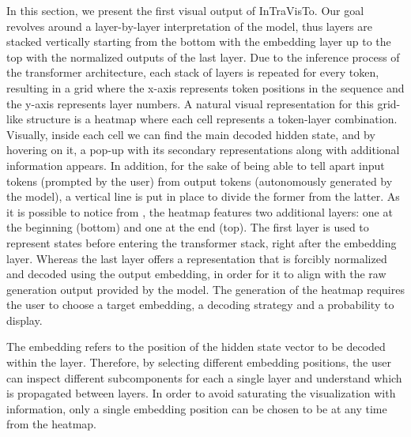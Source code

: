 In this section, we present the first visual output of InTraVisTo.
Our goal revolves around a layer-by-layer interpretation of the model, thus layers are stacked vertically starting from the bottom with the embedding layer up to the top with the normalized outputs of the last layer.
Due to the inference process of the transformer architecture, each stack of layers is repeated for every token, resulting in a grid where the x-axis represents token positions in the sequence and the y-axis represents layer numbers.
A natural visual representation for this grid-like structure is a heatmap where each cell represents a token-layer combination.
Visually, inside each cell we can find the main decoded hidden state, and by hovering on it, a pop-up with its secondary representations along with additional information appears.
In addition, for the sake of being able to tell apart input tokens (prompted by the user) from output tokens (autonomously generated by the model), a vertical line is put in place to divide the former from the latter.
As it is possible to notice from , the heatmap features two additional layers: one at the beginning (bottom) and one at the end (top).
The first layer is used to represent states before entering the transformer stack, right after the embedding layer.
Whereas the last layer offers a representation that is forcibly normalized and decoded using the output embedding, in order for it to align with the raw generation output provided by the model.
The generation of the heatmap requires the user to choose a target embedding, a decoding strategy and a probability to display.

The embedding refers to the position of the hidden state vector to be decoded within the layer.
Therefore, by selecting different embedding positions, the user can inspect different subcomponents for each a single layer and understand which  is propagated between layers. 
In order to avoid saturating the visualization with information, only a single embedding position can be chosen to be  at any time from the heatmap.

